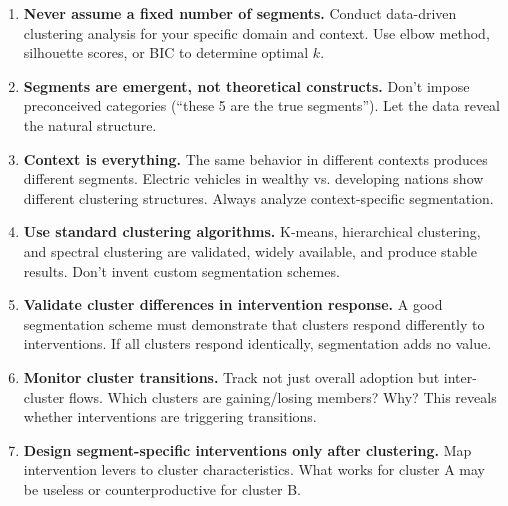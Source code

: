 \begin{tcolorbox}[colback=green!5!white, colframe=green!75!black,
    title=Practical Implications of Segmentation Genesis]

\begin{enumerate}

\item \textbf{Never assume a fixed number of segments.} Conduct data-driven
clustering analysis for your specific domain and context. Use elbow method,
silhouette scores, or BIC to determine optimal $k$.

\item \textbf{Segments are emergent, not theoretical constructs.} Don't impose
preconceived categories (``these 5 are the true segments''). Let the data reveal
the natural structure.

\item \textbf{Context is everything.} The same behavior in different contexts
produces different segments. Electric vehicles in wealthy vs. developing nations
show different clustering structures. Always analyze context-specific segmentation.

\item \textbf{Use standard clustering algorithms.} K-means, hierarchical clustering,
and spectral clustering are validated, widely available, and produce stable results.
Don't invent custom segmentation schemes.

\item \textbf{Validate cluster differences in intervention response.} A good
segmentation scheme must demonstrate that clusters respond differently to
interventions. If all clusters respond identically, segmentation adds no value.

\item \textbf{Monitor cluster transitions.} Track not just overall adoption but
inter-cluster flows. Which clusters are gaining/losing members? Why? This reveals
whether interventions are triggering transitions.

\item \textbf{Design segment-specific interventions only after clustering.} Map
intervention levers to cluster characteristics. What works for cluster A may be
useless or counterproductive for cluster B.
\cite{thaler2008nudge, dellavigna2021illusion}

\end{enumerate}

\end{tcolorbox}

